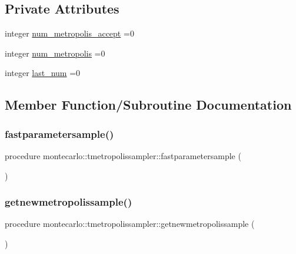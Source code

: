 \subsection*{Private Attributes}
\begin{DoxyCompactItemize}
\item 
integer \mbox{\hyperlink{structmontecarlo_1_1tmetropolissampler_a1b0be11a09ec4146a84b6e42da074d1b}{num\+\_\+metropolis\+\_\+accept}} =0
\item 
integer \mbox{\hyperlink{structmontecarlo_1_1tmetropolissampler_a0eab224d912b2c40895afa8e8eb8f83a}{num\+\_\+metropolis}} =0
\item 
integer \mbox{\hyperlink{structmontecarlo_1_1tmetropolissampler_a64063877f1eaab6e59c15a4cb7b7ac07}{last\+\_\+num}} =0
\end{DoxyCompactItemize}


\subsection{Member Function/\+Subroutine Documentation}
\mbox{\label{structmontecarlo_1_1tmetropolissampler_acc34d98e196bcfd8dcf41f5f134bb13d}} 
\subsubsection{\texorpdfstring{fastparametersample()}{fastparametersample()}}
{\footnotesize\ttfamily procedure montecarlo\+::tmetropolissampler\+::fastparametersample (\begin{DoxyParamCaption}{ }\end{DoxyParamCaption})\hspace{0.3cm}{\ttfamily [private]}}

\mbox{\label{structmontecarlo_1_1tmetropolissampler_aea3e4856816f53bf7ba18f8df1a29c68}} 
\subsubsection{\texorpdfstring{getnewmetropolissample()}{getnewmetropolissample()}}
{\footnotesize\ttfamily procedure montecarlo\+::tmetropolissampler\+::getnewmetropolissample (\begin{DoxyParamCaption}{ }\end{DoxyParamCaption})\hspace{0.3cm}{\ttfamily [private]}}

